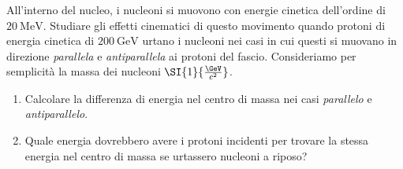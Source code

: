\begin{exercise}
	All'interno del nucleo, i nucleoni si muovono con energie cinetica
	dell'ordine di $\qty{20}{\MeV}$.
	Studiare gli effetti cinematici di questo movimento quando protoni di energia
	cinetica di $\qty{200}{\GeV}$ urtano i nucleoni nei casi in cui questi si
	muovano in direzione \textit{parallela} e \textit{antiparallela} ai protoni
	del fascio.
	Consideriamo per semplicità la massa dei nucleoni $\SI{1}{\frac{\GeV}{c^2}}$.
	\begin{enumerate}
		\item Calcolare la differenza di energia nel centro di massa nei casi
		      \textit{parallelo} e \textit{antiparallelo}.
		\item Quale energia dovrebbero avere i protoni incidenti per trovare la
		      stessa energia nel centro di massa se urtassero nucleoni a riposo?
	\end{enumerate}


\end{exercise}
